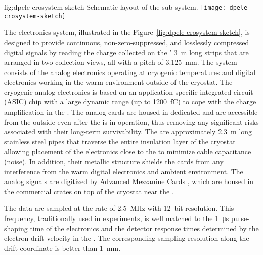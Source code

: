 \begin{dunefigure}{fig:dpele-crosystem-sketch}
{Schematic layout of the   sub-system.}
\texttt{[image: dpele-crosystem-sketch]}
\end{dunefigure}

The  electronics system, illustrated in the Figure~\ref{fig:dpele-crosystem-sketch}, is designed to provide continuous, non-zero-suppressed, and losslessly compressed digital signals by reading the charge collected on the ' \SI{3}{m} long strips that are arranged in two collection views, all with a pitch of \SI{3.125}{mm}.%
The system consists of %
the  analog electronics operating at cryogenic temperatures and digital electronics working in the warm environment outside of the cryostat.  The cryogenic  analog electronics is based on an application-specific integrated circuit (ASIC) chip with a large dynamic range (up to \SI{1200}{fC}) to cope with the charge amplification in the . The analog  cards are housed in dedicated  and are accessible from the outside even after the  is in operation, thus removing any significant risks associated with their long-term survivability. The  are approximately \SI{2.3}{m} long stainless steel pipes 
that traverse the entire insulation layer of the cryostat allowing placement of the  electronics close to the  to minimize cable capacitance (noise).  In addition, their metallic structure shields the  cards 
from any interference from the warm digital electronics and ambient environment. The analog signals are digitized by Advanced Mezzanine Cards , which are housed in the commercial  crates on top of the cryostat near the . 

The  data are sampled at the rate of \SI{2.5}{MHz} with \SI{12}{bit} resolution.  
This frequency, traditionally used in \lartpc experiments, is well matched to the \SI{1}{\micro\second} pulse-shaping time of the  electronics and the detector response times determined by the electron drift velocity in the \lar. The corresponding sampling resolution along the drift coordinate is better than \SI{1}{\mm}. 

